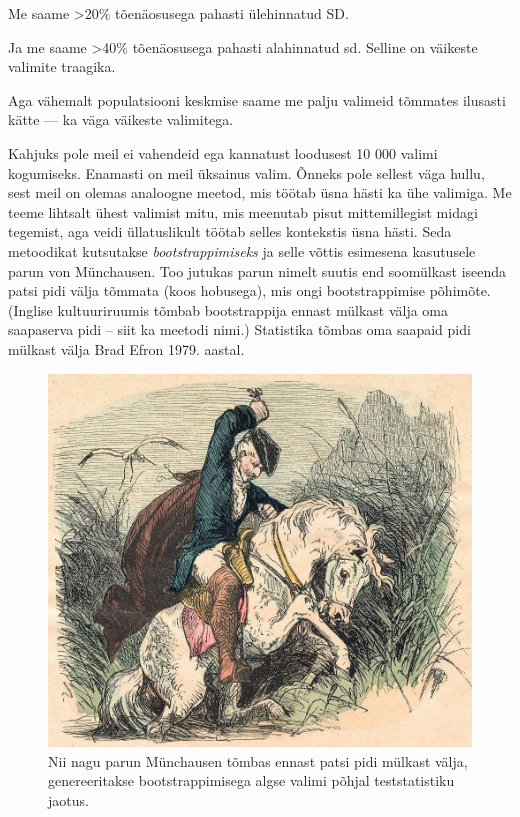 \documentclass[]{book}
\newenvironment{Shaded}{\begin{snugshade}}{\end{snugshade}}
\newcommand{\KeywordTok}[1]{\textcolor[rgb]{0.13,0.29,0.53}{\textbf{#1}}}
\newcommand{\DecValTok}[1]{\textcolor[rgb]{0.00,0.00,0.81}{#1}}
\newcommand{\StringTok}[1]{\textcolor[rgb]{0.31,0.60,0.02}{#1}}
\newcommand{\CommentTok}[1]{\textcolor[rgb]{0.56,0.35,0.01}{\textit{#1}}}
\newcommand{\OperatorTok}[1]{\textcolor[rgb]{0.81,0.36,0.00}{\textbf{#1}}}
\newcommand{\NormalTok}[1]{#1}
\begin{document}
Me saame \textgreater{}20\% tõenäosusega pahasti ülehinnatud SD.

\begin{Shaded}
\end{Shaded}

Ja me saame \textgreater{}40\% tõenäosusega pahasti alahinnatud sd.
Selline on väikeste valimite traagika.

Aga vähemalt populatsiooni keskmise saame me palju valimeid tõmmates
ilusasti kätte --- ka väga väikeste valimitega.

Kahjuks pole meil ei vahendeid ega kannatust loodusest 10 000 valimi
kogumiseks. Enamasti on meil üksainus valim. Õnneks pole sellest väga
hullu, sest meil on olemas analoogne meetod, mis töötab üsna hästi ka
ühe valimiga. Me teeme lihtsalt ühest valimist mitu, mis meenutab pisut
mittemillegist midagi tegemist, aga veidi üllatuslikult töötab selles
kontekstis üsna hästi. Seda metoodikat kutsutakse
\emph{bootstrappimiseks} ja selle võttis esimesena kasutusele parun von
Münchausen. Too jutukas parun nimelt suutis end soomülkast iseenda patsi
pidi välja tõmmata (koos hobusega), mis ongi bootstrappimise põhimõte.
(Inglise kultuuriruumis tõmbab bootstrappija ennast mülkast välja oma
saapaserva pidi -- siit ka meetodi nimi.) Statistika tõmbas oma saapaid
pidi mülkast välja Brad Efron 1979. aastal.





\begin{figure}
\includegraphics[width=0.5\linewidth]{img/munchausen} \caption{Nii nagu parun Münchausen tõmbas ennast patsi pidi mülkast
välja, genereeritakse bootstrappimisega algse valimi põhjal
teststatistiku jaotus.}\label{fig:parun}
\end{figure}
\end{document}
